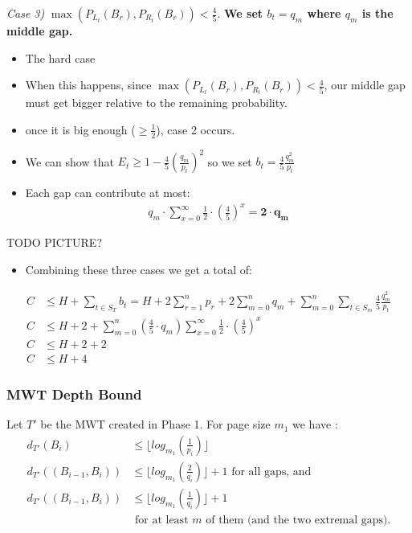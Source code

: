 \documentclass{beamer}
\theoremstyle{plain}
\begin{document}
\begin{frame}
\textit{Case 3)} $\max(P_{L_t}(B_r), P_{R_t}(B_r)) < \frac{4}{5}$. \textbf{We set $b_t = q_m$ where $q_m$ is the middle gap.}

\begin{itemize}
\item The hard case
\item When this happens, since $\max(P_{L_t}(B_r), P_{R_t}(B_r)) < \frac{4}{5}$, our middle gap must get bigger relative to the remaining probability.
\item once it is big enough ($\geq \frac{1}{2}$), case 2 occurs.
\item We can show that $E_t \geq 1 - \frac{4}{5}(\frac{q_m}{p_t})^2$ so we set $b_t = \frac{4}{5}\frac{q_m^2}{p_t}$ 
\item Each gap can contribute at most:
\begin{align*}
q_m \cdot \sum\limits_{x=0}^{\infty} \frac{1}{2} \cdot (\frac{4}{5}) ^ x = \mathbf{2 \cdot q_m}
\end{align*}
\end{itemize}
TODO PICTURE?
\end{frame}

\begin{frame}

\begin{itemize}
\item Combining these three cases we get a total of:
\end{itemize}

\begin{align*}
C &\leq H + \sum_{t \in S_T} b_t = H + 2 \sum\limits_{r = 1}^n p_r + 2 \sum\limits_{m = 0}^n q_m + \sum\limits_{m = 0}^n \sum\limits_{t \in S_m} \frac{4}{5}\frac{q_m^2}{p_t}\\
C &\leq H + 2 + \sum\limits_{m = 0}^n (\frac{4}{5} \cdot q_m) \sum\limits_{x=0}^{\infty} \frac{1}{2} \cdot (\frac{4}{5}) ^ x \\
C &\leq H + 2 + 2 \\
C &\leq H + 4
\end{align*}
\end{frame}

\begin{frame}\frametitle{MWT Depth Bound}
Let $T'$ be the MWT created in Phase 1. For page size $m_1$ we have \cite{bose2009efficient}:
\begin{align*} d_{T'}(B_i) &\leq \lfloor log_{m_1}(\frac{1}{p_i}) \rfloor \\
d_{T'}((B_{i-1},B_i)) &\leq \lfloor log_{m_1}(\frac{2}{q_i}) \rfloor + 1 \text{ for all gaps, and}\\
d_{T'}((B_{i-1},B_i)) &\leq \lfloor log_{m_1}(\frac{1}{q_i}) \rfloor + 1 \\ 
&\text{ for at least $m$ of them (and the two extremal gaps).}
 \end{align*}
\end{frame}
\end{document}

